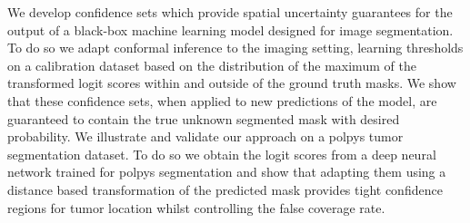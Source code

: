 We develop confidence sets which provide spatial uncertainty guarantees for the output of a black-box machine learning model designed for image segmentation. To do so we adapt conformal inference to the imaging setting, learning thresholds  on a calibration dataset based on the distribution of the maximum of the transformed logit scores within and outside of the ground truth masks. We show that these confidence sets, when applied to new predictions of the model, are guaranteed to contain the true unknown segmented mask with desired probability. We illustrate and validate our approach on a polpys tumor segmentation dataset. To do so we obtain the logit scores from a deep neural network trained for polpys segmentation and show that adapting them using a distance based transformation of the predicted mask provides tight confidence regions for tumor location whilst controlling the false coverage rate. 